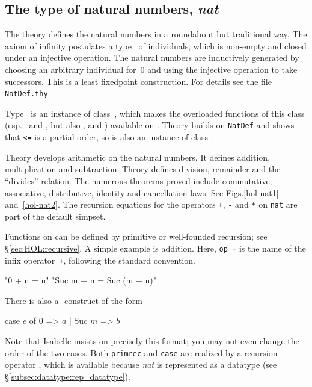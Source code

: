 \subsection{The type of natural numbers, \textit{nat}}

The theory  defines the natural numbers in a roundabout but
traditional way.  The axiom of infinity postulates a type~ of
individuals, which is non-empty and closed under an injective operation.  The
natural numbers are inductively generated by choosing an arbitrary individual
for~0 and using the injective operation to take successors.  This is a least
fixedpoint construction.  For details see the file \texttt{NatDef.thy}.

Type~ is an instance of class~, which makes the
overloaded functions of this class (esp.\ \cdx{<} and \cdx{<=}, but also
,  and ) available on .  Theory
 builds on \texttt{NatDef} and shows that {\tt<=} is a partial order,
so  is also an instance of class .

Theory  develops arithmetic on the natural numbers.  It defines
addition, multiplication and subtraction.  Theory  defines
division, remainder and the ``divides'' relation.  The numerous theorems
proved include commutative, associative, distributive, identity and
cancellation laws.  See Figs.\ts\ref{hol-nat1} and~\ref{hol-nat2}.  The
recursion equations for the operators \texttt{+}, \texttt{-} and \texttt{*} on
\texttt{nat} are part of the default simpset.

Functions on  can be defined by primitive or well-founded recursion;
see {\S}\ref{sec:HOL:recursive}.  A simple example is addition.
Here, \texttt{op +} is the name of the infix operator~\texttt{+}, following
the standard convention.
\begin{ttbox}
      "0 + n = n"
  "Suc m + n = Suc (m + n)"
\end{ttbox}
There is also a -construct
of the form
\begin{ttbox}
case \(e\) of 0 => \(a\) | Suc \(m\) => \(b\)
\end{ttbox}
Note that Isabelle insists on precisely this format; you may not even change
the order of the two cases.
Both \texttt{primrec} and \texttt{case} are realized by a recursion operator
, which is available because \textit{nat} is represented as
a datatype (see {\S}\ref{subsec:datatype:rep_datatype}).

